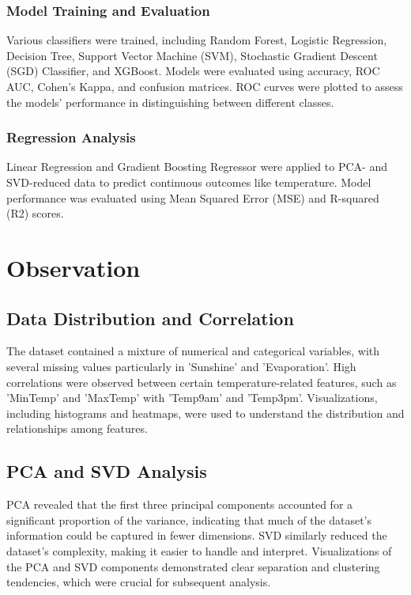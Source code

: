 \documentclass[12pt]{article}
\begin{document}
\subsubsection{Model Training and Evaluation}
Various classifiers were trained, including Random Forest, Logistic Regression, Decision Tree, Support Vector Machine (SVM), Stochastic Gradient Descent (SGD) Classifier, and XGBoost. Models were evaluated using accuracy, ROC AUC, Cohen's Kappa, and confusion matrices. ROC curves were plotted to assess the models' performance in distinguishing between different classes.

\subsubsection{Regression Analysis}
Linear Regression and Gradient Boosting Regressor were applied to PCA- and SVD-reduced data to predict continuous outcomes like temperature. Model performance was evaluated using Mean Squared Error (MSE) and R-squared (R2) scores.

\section{Observation}
\subsection{Data Distribution and Correlation}
The dataset contained a mixture of numerical and categorical variables, with several missing values particularly in 'Sunshine' and 'Evaporation'. High correlations were observed between certain temperature-related features, such as 'MinTemp' and 'MaxTemp' with 'Temp9am' and 'Temp3pm'. Visualizations, including histograms and heatmaps, were used to understand the distribution and relationships among features.

\subsection{PCA and SVD Analysis}
PCA revealed that the first three principal components accounted for a significant proportion of the variance, indicating that much of the dataset's information could be captured in fewer dimensions. SVD similarly reduced the dataset's complexity, making it easier to handle and interpret. Visualizations of the PCA and SVD components demonstrated clear separation and clustering tendencies, which were crucial for subsequent analysis.
\end{document}
